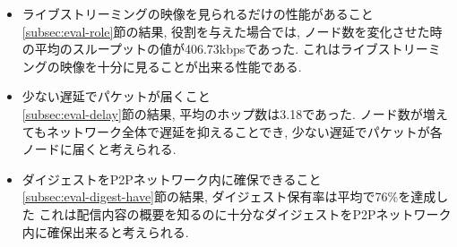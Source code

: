 \begin{itemize}
\item ライブストリーミングの映像を見られるだけの性能があること \\
\ref{subsec:eval-role}節の結果, 役割を与えた場合では, ノード数を変化させた時の平均のスループットの値が406.73kbpsであった. これはライブストリーミングの映像を十分に見ることが出来る性能である.
\item 少ない遅延でパケットが届くこと \\
\ref{subsec:eval-delay}節の結果, 平均のホップ数は3.18であった. ノード数が増えてもネットワーク全体で遅延を抑えることでき, 少ない遅延でパケットが各ノードに届くと考えられる.
\item ダイジェストをP2Pネットワーク内に確保できること \\
\ref{subsec:eval-digest-have}節の結果, ダイジェスト保有率は平均で76\%を達成した これは配信内容の概要を知るのに十分なダイジェストをP2Pネットワーク内に確保出来ると考えられる.
\end{itemize}

